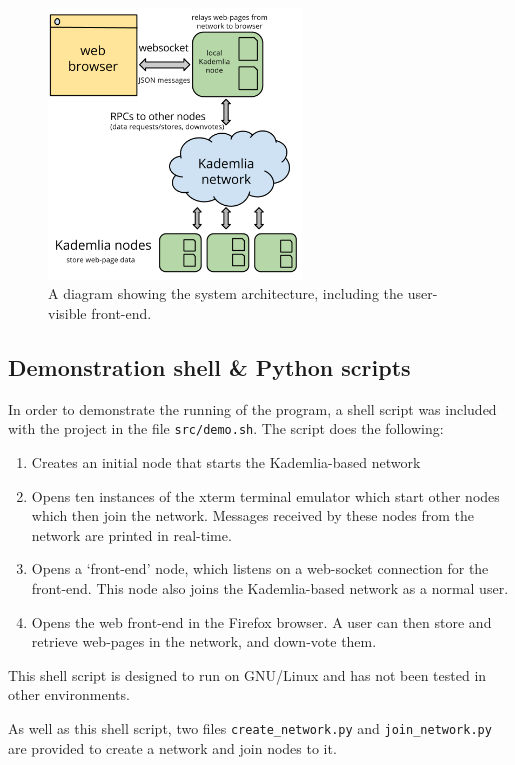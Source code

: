 \begin{figure}[H]
    \centering
    \includegraphics[width=0.6\textwidth]{img/arch-frontend.png}
    \caption{A diagram showing the system architecture, including the user-visible front-end.}
    \label{fig:arch-frontend}
\end{figure}

\subsection{Demonstration shell \& Python scripts}

In order to demonstrate the running of the program, a shell script was included with the project in the
file \texttt{src/demo.sh}.
The script does the following:
\begin{enumerate}
    \item {Creates an initial node that starts the Kademlia-based network}
    \item {Opens ten instances of the xterm terminal emulator which start other nodes
        which then join the network. Messages received by these nodes from the network
        are printed in real-time.}
    \item {Opens a `front-end' node, which listens on a web-socket connection for the front-end.
        This node also joins the Kademlia-based network as a normal user.}
    \item {Opens the web front-end in the Firefox browser. A user can then store and retrieve
        web-pages in the network, and down-vote them.}
\end{enumerate}

This shell script is designed to run on GNU/Linux and has not been tested in other environments.

As well as this shell script, two files \texttt{create\_network.py} and \texttt{join\_network.py}
are provided to create a network and join nodes to it.

